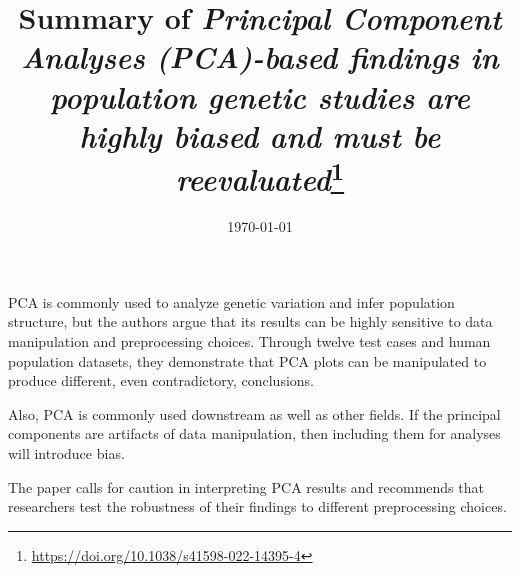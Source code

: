 \documentclass[letterpaper, 11pt]{article}
\title{\vspace{-1.5cm} Summary of \textit{Principal Component Analyses (PCA)-based findings in population genetic studies are highly biased and must be reevaluated}\footnote{\url{https://doi.org/10.1038/s41598-022-14395-4}}}
\date{\today}
\begin{document}
\hypersetup{colorlinks=true, linkcolor=blue, urlcolor=blue}
\maketitle

PCA is commonly used to analyze genetic variation and infer population structure, but the authors argue that its results can be highly sensitive to data manipulation and preprocessing choices.
Through twelve test cases and human population datasets, they demonstrate that PCA plots can be manipulated to produce different, even contradictory, conclusions.

Also, PCA is commonly used downstream as well as other fields. If the principal components are artifacts of data manipulation,
then including them for analyses will introduce bias.

The paper calls for caution in interpreting PCA results and recommends that researchers test the robustness of their findings to different preprocessing choices.
\end{document}
